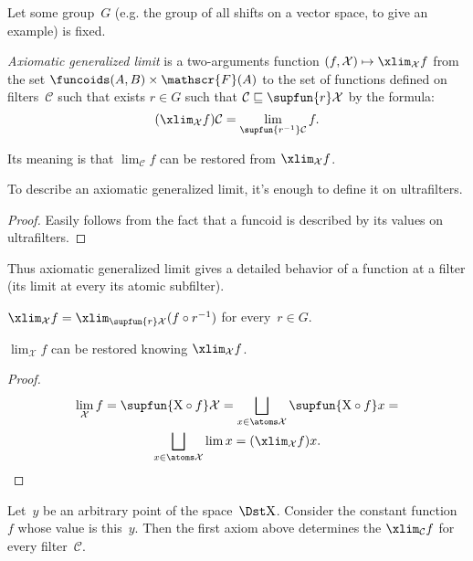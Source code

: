 Let some group~$G$ (e.g. the group of all shifts on a vector
space, to give an example) is fixed.

\begin{defn}
\emph{Axiomatic generalized limit} is a two-arguments function $(f,\mathcal{X})\mapsto\xlim_{\mathcal{X}}f$
from the set $\funcoids(A,B)\times\mathscr{F}(A)$ to the set of functions defined on filters~$\mathcal{C}$ such that exists $r\in G$ such that $\mathcal{C}\sqsubseteq\supfun{r}\mathcal{X}$ by the formula:
\[
(\xlim_{\mathcal{X}}f)\mathcal{C} = \lim_{\supfun{r^{-1}}\mathcal{C}} f.
\]
\end{defn}

\begin{rem}
Its meaning is that $\lim_{\mathcal{C}} f$ can be restored from
$\xlim_{\mathcal{X}}f$.
\end{rem}

\begin{prop}
To describe an axiomatic generalized limit, it's enough to define
it on ultrafilters.
\end{prop}

\begin{proof}
Easily follows from the fact that a funcoid is described by its values on ultrafilters.
\end{proof}

Thus axiomatic generalized limit gives a detailed behavior of
a function at a filter (its limit at every its atomic subfilter).

\begin{obvious}
$\xlim_{\mathcal{X}}f = \xlim_{\supfun{r}\mathcal{X}}(f\circ r^{-1})$ for every~$r\in G$.
\end{obvious}

\begin{thm}
$\lim_{\mathcal{X}} f$ can be restored knowing $\xlim_{\mathcal{X}} f$.
\end{thm}

\begin{proof}
\begin{multline*}
\lim_{\mathcal{X}} f = \supfun{\mathrm{X}\circ f}\mathcal{X} =
\bigsqcup_{x\in\atoms\mathcal{X}} \supfun{\mathrm{X}\circ f}x = \\
\bigsqcup_{x\in\atoms\mathcal{X}} \lim x =
(\xlim_{\mathcal{X}}f)x.
\end{multline*}
\end{proof}

Let~$y$ be an arbitrary point of the space~$\Dst\mathrm{X}$. Consider
the constant function~$f$ whose value is this~$y$.
Then the first axiom above determines the $\xlim_{\mathcal{C}} f$
for every filter~$\mathcal{C}$.

